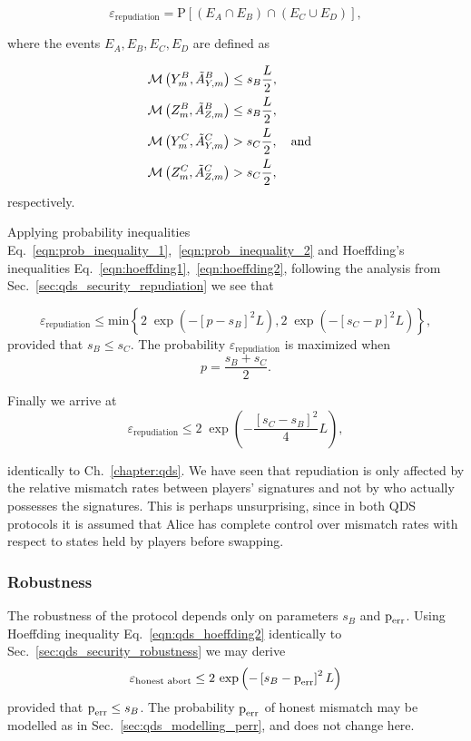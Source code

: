 \begin{equation}
\varepsilon_{\text{repudiation}} = \text{P}\left[\left(E_A \cap E_B\right) \cap \left(E_C \cup E_D\right) \right],
\end{equation}

\noindent where the events $E_A, E_B, E_C, E_D$ are defined as

\begin{align}
&\mathcal{M}\left(Y_m^B, \tilde{A}_{Y, m}^B\right) \le s_B \frac{L}{2}, \notag \\
%
&\mathcal{M}\left(Z_m^B, \tilde{A}_{Z, m}^B\right) \le s_B \frac{L}{2}, \notag \\
%
&\mathcal{M}\left(Y_m^C, \tilde{A}_{Y, m}^C\right) > s_C \frac{L}{2}, \qq{and}\notag \\
%
&\mathcal{M}\left(Z_m^C, \tilde{A}_{Z, m}^C\right) > s_C \frac{L}{2},
\end{align}
respectively.

Applying probability inequalities Eq.~\ref{eqn:prob_inequality_1},~\ref{eqn:prob_inequality_2} and Hoeffding's inequalities Eq.~\ref{eqn:hoeffding1},~\ref{eqn:hoeffding2}, following the analysis from Sec.~\ref{sec:qds_security_repudiation} we see that

\begin{equation}
\varepsilon_{\text{repudiation}} \le \text{min}\left\{ 2 \; \exp\left(-\left[ p - s_B\right]^2 L\right), 2 \; \exp\left( - \left[ s_C - p\right]^2 L\right) \right\},
\end{equation}
\noindent 
provided that $s_B \le s_C$. The probability $\varepsilon_{\text{repudiation}}$ is maximized when
\begin{equation}
p = \frac{s_B + s_C}{2}.
\end{equation}

\noindent Finally we arrive at
\begin{equation}\label{eqn:aqc_repudiation}
\varepsilon_{\text{repudiation}} \le 2 \; \exp\left( - \frac{\left[s_C - s_B\right]^2}{4}L\right),
\end{equation}

\noindent identically to Ch.~\ref{chapter:qds}. We have seen that repudiation is only affected by the relative mismatch rates between players' signatures and not by who actually possesses the signatures. This is perhaps unsurprising, since in both QDS protocols it is assumed that Alice has complete control over mismatch rates with respect to states held by players before swapping.

\subsubsection{Robustness}
The robustness of the protocol depends only on parameters $s_B$ and $\text{p}_{\text{err}}$. Using Hoeffding inequality Eq.~\ref{eqn:qds_hoeffding2} identically to Sec.~\ref{sec:qds_security_robustness} we may derive 
\begin{equation}\label{eqn:aqc_robustness}
\varepsilon_{\text{honest abort}} \le 2 \, \exp\left( - \left[s_B - \text{p}_{\text{err}}\right]^2 L\right)
\end{equation}
provided that $\text{p}_{\text{err}} \le s_B$. The probability $\text{p}_{\text{err}}$ of honest mismatch may be modelled as in Sec.~\ref{sec:qds_modelling_perr}, and does not change here.

